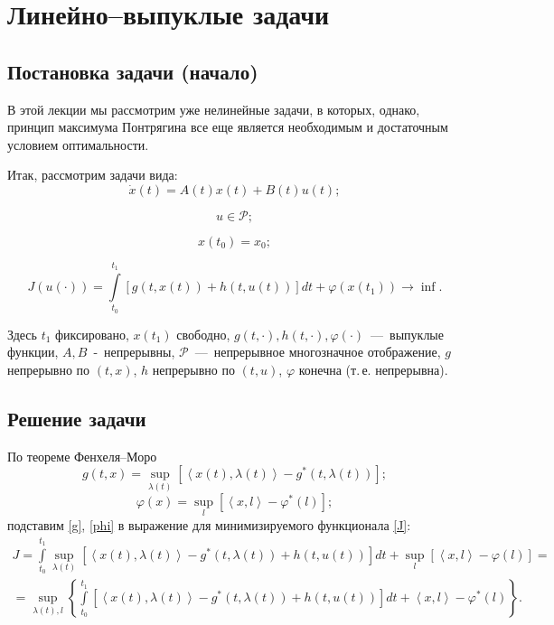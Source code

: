 \section{Линейно--выпуклые задачи}
\subsection{Постановка задачи (начало)}
\par В этой лекции мы рассмотрим уже нелинейные задачи, в которых, однако, принцип максимума Понтрягина все еще является необходимым и достаточным условием оптимальности.
\par Итак, рассмотрим задачи вида:
\begin{equation}
	\dot{x}(t)=A(t)x(t)+B(t)u(t);
\end{equation}

\begin{equation}
	u \in \mathcal{P};
\end{equation}

\begin{equation}
	x(t_0)=x_0;
\end{equation}

\begin{equation}\label{J}
	J(u(\cdot)) =
	  \int\limits_{t_0}^{t_1}[g(t,x(t))+h(t,u(t))]dt+\varphi(x(t_1)) \rightarrow \inf.
\end{equation}

Здесь $ t_1 $ фиксировано, $x(t_1)$ свободно, $g(t,\cdot),h(t,\cdot),\varphi(\cdot)$~---~выпуклые функции, $A,B$~-~непрерывны, $\mathcal{P}$~---~непрерывное многозначное отображение, $g$ непрерывно по $(t,x)$, $h$ непрерывно по $(t,u)$, $\varphi$ конечна (т.\,е. непрерывна).
\subsection{Решение задачи}
\par По теореме Фенхеля--Моро
\begin{equation}\label{g}
g(t,x)=\sup_{\lambda(t)}\left[\left< x(t),\lambda(t) \right> - g^*(t,\lambda(t) )\right];
\end{equation}
\begin{equation}\label{phi}
\varphi(x)=\sup_{l}\left[\left<x,l\right> - \varphi^*(l)\right];
\end{equation}
подставим \eqref{g}, \eqref{phi} в выражение для минимизируемого функционала \eqref{J}:
\begin{multline}\label{JJ}
J=\int\limits_{t_0}^{t_1}\sup_{\lambda(t)}\left[\left< x(t),\lambda(t) \right> - g^*(t,\lambda(t)) +h(t,u(t))\right] dt + \sup_{l}\left[\left<x,l\right> - \varphi(l)\right]=\\=\sup_{\lambda(t),l}\left\lbrace \int\limits_{t_0}^{t_1}\left[\left< x(t),\lambda(t) \right> - g^*(t,\lambda(t)) +h(t,u(t))\right] dt + \left<x,l\right> - \varphi^*(l)\right\rbrace.
\end{multline}

